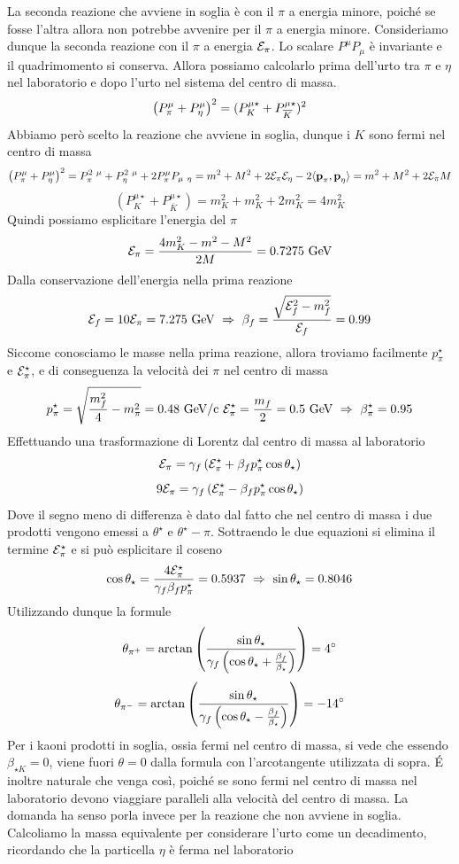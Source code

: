 \documentclass[12pt,twoside,a4]{article}
\begin{document}
\begin{solution}
La seconda reazione che avviene in soglia è con il $\pi$ a energia minore, poiché se fosse l'altra allora non potrebbe avvenire per il $\pi$ a energia minore. Consideriamo dunque la seconda reazione con il $\pi$ a energia $\mathcal{E}_\pi$. Lo scalare $P^\mu P_\mu$ è invariante e il quadrimomento si conserva. Allora possiamo calcolarlo prima dell'urto tra $\pi$ e $\eta$ nel laboratorio e dopo l'urto nel sistema del centro di massa.
$$ \left({P^\mu_\pi + P^\mu_\eta}\right)^2 = (P^{\mu \star}_K + P^{\mu \star}_{\overline{K}})^2 $$
Abbiamo però scelto la reazione che avviene in soglia, dunque i $K$ sono fermi nel centro di massa
$$ \left({P^\mu_\pi + P^\mu_\eta}\right)^2 = P^{2 \mbox{ } \mu}_{\pi} + P^{2 \mbox{ } \mu}_{\eta} + 2 P^\mu_\pi P_{\mu \mbox{ } \eta} = 
m^2 + M^2 + 2\mathcal{E}_\pi \mathcal{E}_\eta - 2\langle{\textbf{p}_\pi},{\textbf{p}_\eta}\rangle =
m^2 + M^2 + 2 \mathcal{E}_\pi M $$
$$ (P^{\mu \star}_K + P^{\mu \star}_{\overline{K}}) = m_K^2 + m_K^2 + 2m_K^2 = 4 m_K^2$$
Quindi possiamo esplicitare l'energia del $\pi$
$$ \mathcal{E}_\pi = \frac{4 m_K^2 - m^2 - M^2}{2M} = 0.7275 \mbox{ GeV}$$
Dalla conservazione dell'energia nella prima reazione
$$ \mathcal{E}_f = 10 \mathcal{E}_\pi = 7.275 \mbox{ GeV}  \  \Rightarrow  \  \beta_f = \frac{\sqrt{\mathcal{E}_f^2 - m_f^2}}{\mathcal{E}_f} = 0.99$$
Siccome conosciamo le masse nella prima reazione, allora troviamo facilmente $p^\star_\pi$ e $\mathcal{E}^\star_\pi$, e di conseguenza la velocità  dei $\pi$ nel centro di massa
$$ p^\star_\pi = \sqrt{\frac{m_f^2}{4} -m^2_\pi} = 0.48 \mbox{ GeV/c}  \  \mathcal{E}^\star_\pi = \frac{m_f}{2} = 0.5 \mbox{ GeV} \mbox{ } \Rightarrow \mbox{ } \beta_{\pi}^\star = 0.95$$
Effettuando una trasformazione di Lorentz dal centro di massa al laboratorio
$$ \mathcal{E}_\pi = \gamma_f \left({ \mathcal{E}^\star_\pi + \beta_f p^\star_\pi \cos \theta_\star}\right)$$
$$ 9\mathcal{E}_\pi = \gamma_f \left({ \mathcal{E}^\star_\pi - \beta_f p^\star_\pi \cos \theta_\star}\right)$$
Dove il segno meno di differenza è dato dal fatto che nel centro di massa i due prodotti vengono emessi a $\theta^\star$ e $ \theta^\star - \pi$. Sottraendo le due equazioni si elimina il termine $\mathcal{E}^\star_\pi$ e si può esplicitare il coseno
$$ \cos {\theta_\star} = \frac{4 \mathcal{E}^\star_\pi}{ \gamma_f \beta_f p^\star_\pi} = 0.5937  \  \Rightarrow  \  \sin \theta_\star = 0.8046$$
Utilizzando dunque la formule
$$ \theta_{\pi^+} = \arctan\left({\frac{\sin\theta_\star}{\gamma_f \left({ \cos \theta_\star + \frac{\beta_f}{\beta_\star}}\right)}}\right) = 4^\circ$$
$$ \theta_{\pi^-} = \arctan\left({\frac{\sin\theta_\star}{\gamma_f \left({ \cos \theta_\star - \frac{\beta_f}{\beta_\star}}\right)}}\right) = -14^\circ$$
Per i kaoni prodotti in soglia, ossia fermi nel centro di massa, si vede che essendo $\beta_{\star K} = 0$, viene fuori $\theta = 0$ dalla formula con l'arcotangente utilizzata di sopra. \'E inoltre naturale che venga così, poiché se sono fermi nel centro di massa nel laboratorio devono viaggiare paralleli alla velocità  del centro di massa. La domanda ha senso porla invece per la reazione che non avviene in soglia. Calcoliamo la massa equivalente per considerare l'urto come un decadimento, ricordando che la particella $\eta$ è ferma nel laboratorio

\end{solution}
\end{document}
